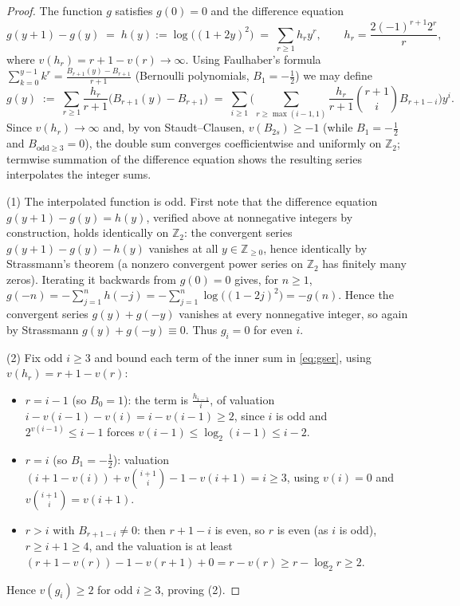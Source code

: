 \documentclass[11pt]{amsart}
\theoremstyle{definition}
\newcommand{\ZZ}{\mathbb{Z}}
\begin{document}
\begin{proof}
The function $g$ satisfies $g(0)=0$ and the difference equation
\[
g(y+1)-g(y)\;=\;h(y):=\log\big((1+2y)^2\big)\;=\;\sum_{r\ge1}h_ry^r,\qquad
h_r=\frac{2(-1)^{r+1}2^r}{r},
\]
where $v(h_r)=r+1-v(r)\to\infty$. Using Faulhaber's formula $\sum_{k=0}^{y-1}k^r=\frac{B_{r+1}(y)-B_{r+1}}{r+1}$ (Bernoulli polynomials, $B_1=-\frac12$) we may define
\begin{equation}\label{eq:gser}
g(y)\;:=\;\sum_{r\ge1}\frac{h_r}{r+1}\big(B_{r+1}(y)-B_{r+1}\big)
\;=\;\sum_{i\ge1}\Big(\sum_{r\ge \max(i-1,1)}\frac{h_r}{r+1}\binom{r+1}{i}B_{r+1-i}\Big)y^i .
\end{equation}
Since $v(h_r)\to\infty$ and, by von Staudt--Clausen, $v(B_{2s})\ge-1$ (while $B_1=-\frac12$ and $B_{\mathrm{odd}\ge3}=0$), the double sum converges coefficientwise and uniformly on $\ZZ_2$; termwise summation of the difference equation shows the resulting series interpolates the integer sums.

(1) The interpolated function is odd. First note that the difference equation $g(y+1)-g(y)=h(y)$, verified above at nonnegative integers by construction, holds identically on $\ZZ_2$: the convergent series $g(y+1)-g(y)-h(y)$ vanishes at all $y\in\ZZ_{\ge0}$, hence identically by Strassmann's theorem (a nonzero convergent power series on $\ZZ_2$ has finitely many zeros). Iterating it backwards from $g(0)=0$ gives, for $n\ge1$,
$g(-n)=-\sum_{j=1}^{n}h(-j)=-\sum_{j=1}^n\log\big((1-2j)^2\big)=-g(n)$. Hence the convergent series $g(y)+g(-y)$ vanishes at every nonnegative integer, so again by Strassmann $g(y)+g(-y)\equiv0$. Thus $g_i=0$ for even $i$.

(2) Fix odd $i\ge3$ and bound each term of the inner sum in \eqref{eq:gser}, using $v(h_r)=r+1-v(r)$:
\begin{itemize}
\item $r=i-1$ (so $B_0=1$): the term is $\frac{h_{i-1}}{i}$, of valuation $i-v(i-1)-v(i)=i-v(i-1)\ge2$, since $i$ is odd and $2^{v(i-1)}\le i-1$ forces $v(i-1)\le\log_2(i-1)\le i-2$.
\item $r=i$ (so $B_1=-\frac12$): valuation $(i+1-v(i))+v\binom{i+1}i-1-v(i+1)=i\ge3$, using $v(i)=0$ and $v\binom{i+1}i=v(i+1)$.
\item $r>i$ with $B_{r+1-i}\ne0$: then $r+1-i$ is even, so $r$ is even (as $i$ is odd), $r\ge i+1\ge4$, and the valuation is at least $(r+1-v(r))-1-v(r+1)+0= r-v(r)\ge r-\log_2 r\ge2$.
\end{itemize}
Hence $v(g_i)\ge 2$ for odd $i\ge3$, proving (2).
\end{proof}
\end{document}
